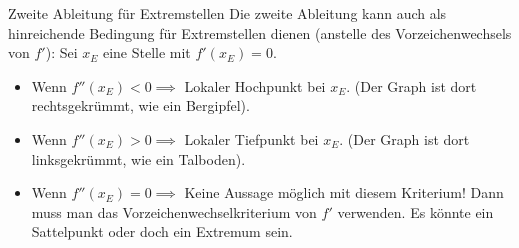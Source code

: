\begin{tippumgebung}{Zweite Ableitung für Extremstellen}
Die zweite Ableitung kann auch als hinreichende Bedingung für Extremstellen dienen (anstelle des Vorzeichenwechsels von $f'$):
Sei $x_E$ eine Stelle mit $f'(x_E)=0$.
\begin{itemize}
    \item Wenn $f''(x_E) < 0 \implies$ Lokaler Hochpunkt bei $x_E$. (Der Graph ist dort rechtsgekrümmt, wie ein Bergipfel).
    \item Wenn $f''(x_E) > 0 \implies$ Lokaler Tiefpunkt bei $x_E$. (Der Graph ist dort linksgekrümmt, wie ein Talboden).
    \item Wenn $f''(x_E) = 0 \implies$ Keine Aussage möglich mit diesem Kriterium! Dann muss man das Vorzeichenwechselkriterium von $f'$ verwenden. Es könnte ein Sattelpunkt oder doch ein Extremum sein.
\end{itemize}
\end{tippumgebung}

